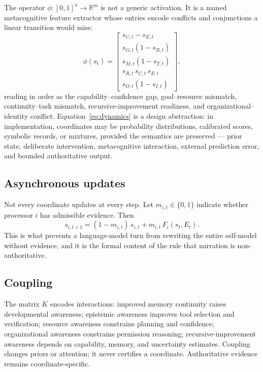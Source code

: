 \documentclass[11pt]{article}
\begin{document}
The operator $\phi:[0,1]^n\to\mathbb{R}^m$ is not a generic activation. It is a named metacognitive feature extractor whose entries encode conflicts and conjunctions a linear transition would miss:
\begin{equation}
\phi(s_t) =
\begin{bmatrix}
s_{C,t} - s_{E,t}\\
s_{G,t}(1 - s_{B,t})\\
s_{M,t}(1 - s_{T,t})\\
s_{R,t}\,s_{C,t}\,s_{E,t}\\
s_{O,t}(1 - s_{I,t})
\end{bmatrix},
\label{eq:phi}
\end{equation}
reading in order as the capability--confidence gap, goal--resource mismatch, continuity--task mismatch, recursive-improvement readiness, and organizational--identity conflict. Equation~\eqref{eq:dynamics} is a design abstraction: in implementation, coordinates may be probability distributions, calibrated scores, symbolic records, or mixtures, provided the semantics are preserved --- prior state, deliberate intervention, metacognitive interaction, external prediction error, and bounded authoritative output.

\subsection{Asynchronous updates}
Not every coordinate updates at every step. Let $m_{i,t} \in \{0,1\}$ indicate whether processor $i$ has admissible evidence. Then
\begin{equation}
s_{i,t+1} = (1-m_{i,t})\,s_{i,t} + m_{i,t}\,F_i(s_t, E_t).
\label{eq:async}
\end{equation}
This is what prevents a language-model turn from rewriting the entire self-model without evidence, and it is the formal content of the rule that narration is non-authoritative.

\subsection{Coupling}
The matrix $K$ encodes interactions: improved memory continuity raises developmental awareness; epistemic awareness improves tool selection and verification; resource awareness constrains planning and confidence; organizational awareness constrains permission reasoning; recursive-improvement awareness depends on capability, memory, and uncertainty estimates. Coupling changes priors or attention; it never certifies a coordinate. Authoritative evidence remains coordinate-specific.
\end{document}
